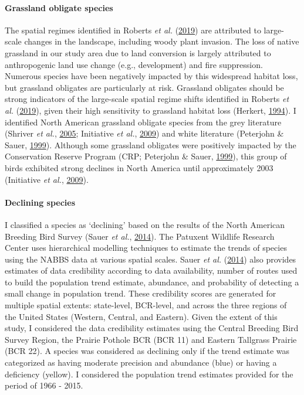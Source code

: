 \documentclass[12pt,twoside,openany]{reedthesis}
\begin{document}
\hypertarget{grassland-obligate-species}{%
\paragraph{Grassland obligate species}\label{grassland-obligate-species}}

The spatial regimes identified in Roberts \emph{et al.} (\protect\hyperlink{ref-roberts2019shifting}{2019}) are attributed to large-scale changes in the landscape, including woody plant invasion. The loss of native grassland in our study area due to land conversion is largely attributed to anthropogenic land use change (e.g., development) and fire suppression. Numerous species have been negatively impacted by this widespread habitat loss, but grassland obligates are particularly at risk. Grassland obligates should be strong indicators of the large-scale spatial regime shifts identified in Roberts \emph{et al.} (\protect\hyperlink{ref-roberts2019shifting}{2019}), given their high sensitivity to grassland habitat loss (Herkert, \protect\hyperlink{ref-herkert1994effects}{1994}). I identified North American grassland obligate species from the grey literature (Shriver \emph{et al.}, \protect\hyperlink{ref-shriver2005distribution}{2005}; Initiative \emph{et al.}, \protect\hyperlink{ref-north2009state}{2009}) and white literature (Peterjohn \& Sauer, \protect\hyperlink{ref-peterjohn1999population}{1999}). Although some grassland obligates were positively impacted by the Conservation Reserve Program (CRP; Peterjohn \& Sauer, \protect\hyperlink{ref-peterjohn1999population}{1999}), this group of birds exhibited strong declines in North America until approximately 2003 (Initiative \emph{et al.}, \protect\hyperlink{ref-north2009state}{2009}).

\hypertarget{declining-species}{%
\paragraph{Declining species}\label{declining-species}}

I classified a species as `declining' based on the results of the North American Breeding Bird Survey (Sauer \emph{et al.}, \protect\hyperlink{ref-sauer2017results}{2014}). The Patuxent Wildlife Research Center uses hierarchical modelling techniques to estimate the trends of species using the NABBS data at various spatial scales. Sauer \emph{et al.} (\protect\hyperlink{ref-sauer2017results}{2014}) also provides estimates of data credibility according to data availability, number of routes used to build the population trend estimate, abundance, and probability of detecting a small change in population trend. These credibility scores are generated for multiple spatial extents: state-level, BCR-level, and across the three regions of the United States (Western, Central, and Eastern). Given the extent of this study, I considered the data credibility estimates using the Central Breeding Bird Survey Region, the Prairie Pothole BCR (BCR 11) and Eastern Tallgrass Prairie (BCR 22). A species was considered as declining only if the trend estimate was categorized as having moderate precision and abundance (blue) or having a deficiency (yellow). I considered the population trend estimates provided for the period of 1966 - 2015.
\end{document}
